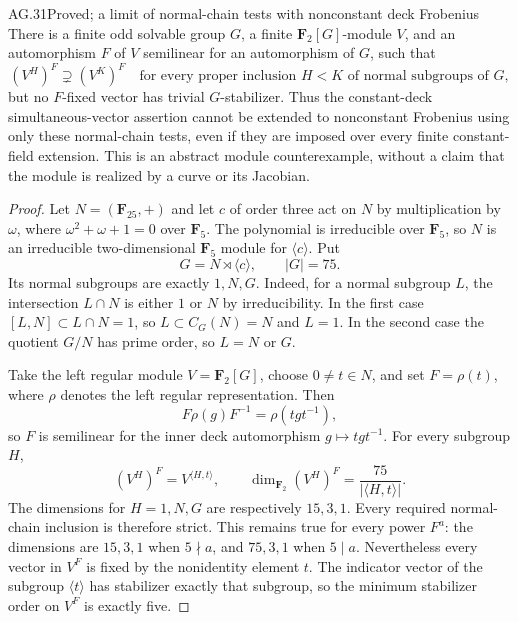 \begin{claim}{AG.31}{Proved; a limit of normal-chain tests with nonconstant deck Frobenius}
There is a finite odd solvable group $G$, a finite
$\mathbf F_2[G]$-module $V$, and an automorphism $F$ of $V$
semilinear for an automorphism of $G$, such that
\[
 (V^H)^F\supsetneq(V^K)^F
 \quad\text{for every proper inclusion }H<K
       \text{ of normal subgroups of }G,
\]
but no $F$-fixed vector has trivial $G$-stabilizer.
Thus the constant-deck simultaneous-vector assertion cannot
be extended to nonconstant Frobenius using only these
normal-chain tests, even if they are imposed over every
finite constant-field extension.
This is an abstract module counterexample, without a claim
that the module is realized by a curve or its Jacobian.
\end{claim}
\begin{proof}
Let $N=(\mathbf F_{25},+)$ and let $c$ of order three act
on $N$ by multiplication by $\omega$, where
$\omega^2+\omega+1=0$ over $\mathbf F_5$.
The polynomial is irreducible over $\mathbf F_5$,
so $N$ is an irreducible two-dimensional $\mathbf F_5$
module for $\langle c\rangle$. Put
\[
             G=N\rtimes\langle c\rangle,
             \qquad |G|=75.
\]
Its normal subgroups are exactly $1,N,G$.
Indeed, for a normal subgroup $L$, the intersection
$L\cap N$ is either $1$ or $N$ by irreducibility.
In the first case $[L,N]\subset L\cap N=1$,
so $L\subset C_G(N)=N$ and $L=1$.
In the second case the quotient $G/N$ has prime order,
so $L=N$ or $G$.

Take the left regular module $V=\mathbf F_2[G]$,
choose $0\ne t\in N$, and set $F=\rho(t)$,
where $\rho$ denotes the left regular representation.
Then
\[
 F\rho(g)F^{-1}=\rho(tgt^{-1}),
\]
so $F$ is semilinear for the inner deck automorphism
$g\mapsto tgt^{-1}$. For every subgroup $H$,
\[
 (V^H)^F=V^{\langle H,t\rangle},\qquad
 \dim_{\mathbf F_2}(V^H)^F
       =\frac{75}{|\langle H,t\rangle|}.
\]
The dimensions for $H=1,N,G$ are respectively
$15,3,1$. Every required normal-chain inclusion
is therefore strict. This remains true for every power $F^a$:
the dimensions are $15,3,1$ when $5\nmid a$, and $75,3,1$
when $5\mid a$. Nevertheless every vector in
$V^F$ is fixed by the nonidentity element $t$.
The indicator vector of the subgroup $\langle t\rangle$
has stabilizer exactly that subgroup, so the minimum
stabilizer order on $V^F$ is exactly five.


\end{proof}
